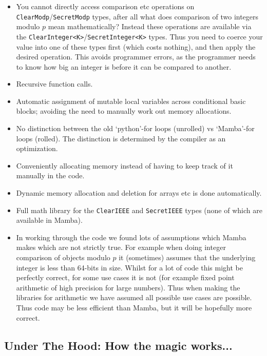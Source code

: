 \begin{itemize}
     \item You cannot directly access comparison etc operations on 
	     \verb|ClearModp|/\verb|SecretModp| types, after all what
	      does comparison of two integers modulo $p$ mean mathematically?
	      Instead these operations are available via the
	      \verb|ClearInteger<K>|/\verb|SecretInteger<K>| types.
	      Thus you need to coerce your value into one of these
	      types first (which costs nothing), and then apply 
	      the desired operation. This avoids programmer errors,
	      as the programmer needs to know how big an integer is
	      before it can be compared to another.
     \item Recursive function calls.
     \item Automatic assignment of mutable local variables across
	     conditional basic blocks; avoiding the need to manually
	     work out memory allocations.
     \item No distinction between the old `python'-for loops (unrolled)
	     vs `Mamba'-for loops (rolled). The distinction is determined
	   by the compiler as an optimization.
     \item Conveniently allocating memory instead of having to keep 
	   track of it manually in the code.
     \item Dynamic memory allocation and deletion for arrays etc is done 
	     automatically.
     \item Full math library for the \verb|ClearIEEE| and \verb|SecretIEEE|
	     types (none of which are available in Mamba).
     \item In working through the code we found lots of assumptions which
	     Mamba makes which are not strictly true. For example when doing
	     integer comparison of objects modulo $p$ it (sometimes) assumes that the
	     underlying integer is less than 64-bits in size.
	     Whilst for a lot of code this might be perfectly correct, for 
	     some use cases it is not (for example fixed point arithmetic
	     of high precision for large numbers). Thus when making the libraries for
	     arithmetic we have assumed all possible use cases are possible.
	     Thus code may be less efficient than Mamba, but it will be hopefully
	     more correct.
\end{itemize}


\subsection{Under The Hood: How the magic works...}

